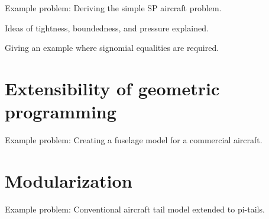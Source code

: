 \documentclass{aiaa-pretty}
\begin{document}
Example problem: Deriving the simple SP aircraft problem. 

Ideas of tightness, boundedness, and pressure explained. 

Giving an example where signomial equalities are required. 

\section{Extensibility of geometric programming}

Example problem: Creating a fuselage model for a commercial aircraft. 

\section{Modularization}

Example problem: Conventional aircraft tail model extended to pi-tails. 
\end{document}
